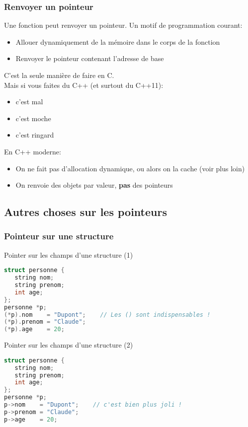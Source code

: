 \documentclass{beamer}
\begin{document}
\begin{frame}[fragile=singleslide,shrink=20]
\frametitle{Renvoyer un pointeur}
Une fonction peut renvoyer un pointeur. Un motif de programmation courant:
\begin{itemize}
\item{Allouer dynamiquement de la mémoire dans le corps de la fonction}
\item{Renvoyer le pointeur contenant l'adresse de base}
\end{itemize}

C'est la seule manière de faire en C. \\
Mais si vous faites du C++ (et surtout du C++11):

\begin{itemize}
\item{c'est mal}
\item{c'est moche}
\item{c'est ringard}
\end{itemize}

En C++ moderne: 

\begin{itemize}
\item{On ne fait pas d'allocation dynamique, ou alors on la cache (voir plus loin)}
\item{On renvoie des objets par valeur, \textbf{pas} des pointeurs}
\end{itemize}
\end{frame}

\subsection{Autres choses sur les pointeurs}

\begin{frame}[fragile=singleslide,shrink=20]
\frametitle{Pointeur sur une structure}
\begin{block}{Pointer sur les champs d'une structure (1)}
\begin{lstlisting}[language=c++]
struct personne {
   string nom;
   string prenom;
   int age;
};
personne *p;
(*p).nom    = "Dupont";    // Les () sont indispensables !
(*p).prenom = "Claude";
(*p).age    = 20;
\end{lstlisting}
\end{block}

\begin{block}{Pointer sur les champs d'une structure (2)}
\begin{lstlisting}[language=c++]
struct personne {
   string nom;
   string prenom;
   int age;
};
personne *p;
p->nom    = "Dupont";    // c'est bien plus joli !
p->prenom = "Claude";
p->age    = 20;
\end{lstlisting}
\end{block}
\end{frame}
\end{document}
